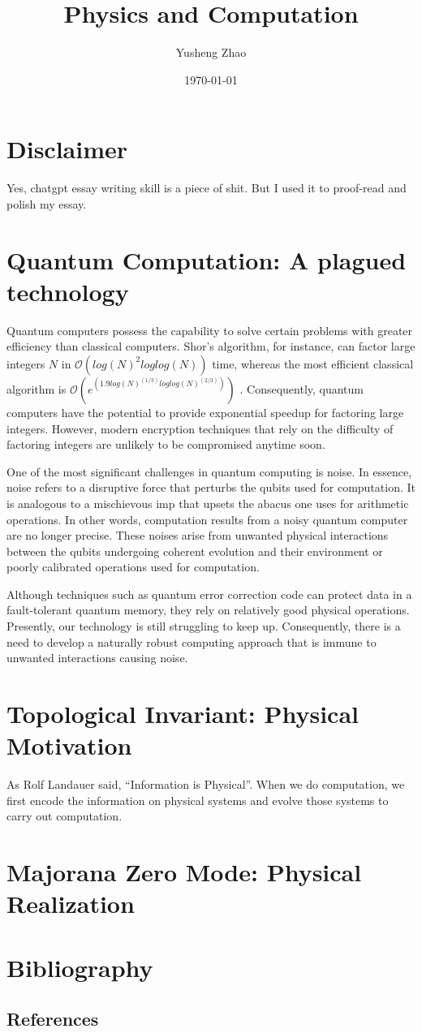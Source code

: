 \documentclass[11pt]{article}
\author{Yusheng Zhao}
\date{\today}
\title{Physics and Computation}
\begin{document}
\maketitle

\section{Disclaimer}
\label{sec:orge7447df}
Yes, chatgpt essay writing skill is a piece of shit. But I used it to proof-read
and polish my essay.

\section{Quantum Computation: A plagued technology}
\label{sec:org89157d0}
Quantum computers possess the capability to solve certain problems with greater
efficiency than classical computers. Shor's algorithm, for instance, can factor
large integers \(N\) in \(\mathcal{O}(log(N)^2 loglog(N))\) time, whereas the most
efficient classical algorithm is \(\mathcal{O}(e^(1.9 log(N)^(1/3)
loglog(N)^(2/3)))\) \cite{ShorAlgorithm2023}. Consequently, quantum computers have
the potential to provide exponential speedup for factoring large integers.
However, modern encryption techniques that rely on the difficulty of factoring
integers are unlikely to be compromised anytime soon.

One of the most significant challenges in quantum computing is noise. In
essence, noise refers to a disruptive force that perturbs the qubits used for
computation. It is analogous to a mischievous imp that upsets the abacus one
uses for arithmetic operations. In other words, computation results from a noisy
quantum computer are no longer precise. These noises arise from unwanted
physical interactions between the qubits undergoing coherent evolution and their
environment or poorly calibrated operations used for computation.

Although techniques such as quantum error correction code can protect data in a
fault-tolerant quantum memory, they rely on relatively good physical
operations\cite{girvinIntroductionQuantumError2022}. Presently, our technology is
still struggling to keep up. Consequently, there is a need to develop a
naturally robust computing approach that is immune to unwanted interactions
causing noise.

\section{Topological Invariant: Physical Motivation}
\label{sec:org666bd8e}
As Rolf Landauer said, ``Information is Physical''. When we do computation, we
first encode the information on physical systems and evolve those systems to
carry out computation.

\section{Majorana Zero Mode: Physical Realization}
\label{sec:orgcc98196}

\section{Bibliography}
\label{sec:org079d476}
\subsection{References}
\label{sec:orgaa29ef4}


\end{document}
